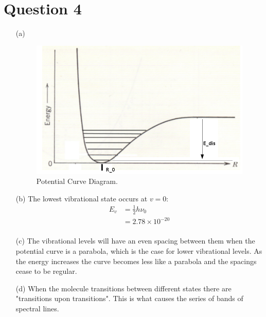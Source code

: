 \documentclass[10pt,a4paper]{article}
\begin{document}
\section*{Question 4}
\begin{itemize}
	\item[(a)] 
		\begin{figure}[!h]
			\begin{center}
				\includegraphics[width=0.8\linewidth]{potentialCurve.png}
			\end{center}
			\caption{Potential Curve Diagram.}
		\end{figure}

	\item[(b)] The lowest vibrational state occurs at $v = 0$:
		\begin{align*}
			E_{v} &= \frac{1}{2}h \nu_{0} \\
			      &= 2.78 \times 10^{-20} \\
		\end{align*}

	\item[(c)] The vibrational levels will have an even spacing between them when the potential curve is a parabola, which is the case for lower vibrational levels. As the energy increases the curve becomes less like a parabola and the spacings cease to be regular.

	\item[(d)] When the molecule transitions between different states there are "transitions upon transitions". This is what causes the series of bands of spectral lines.
\end{itemize}
\end{document}
